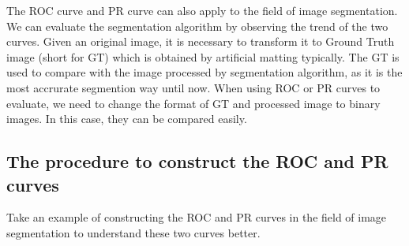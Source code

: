 \documentclass[a4paper,12pt]{article}
\begin{document}
The ROC curve and PR curve can also apply to the field of image segmentation. We can evaluate the segmentation algorithm by observing the trend of the two curves. Given an original image, it is necessary to transform it to Ground Truth image (short for GT) which is obtained by artificial matting typically. The GT is used to compare with the image processed by segmentation algorithm, as it is the most accrurate segmention way until now. When using ROC or PR curves to evaluate, we need to change the format of GT and processed image to binary images. In this case, they can be compared easily.

\subsection{The procedure to construct the ROC and PR curves}

Take an example of constructing the ROC and PR curves in the field of image segmentation to understand these two curves better.  
\end{document}

